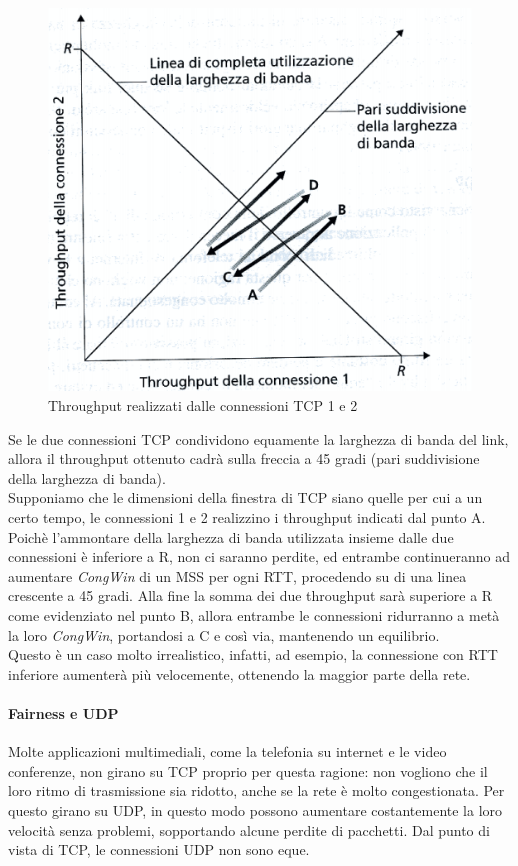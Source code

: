 \documentclass[11pt,a4paper]{book}
\begin{document}
\begin{figure}
	\includegraphics[scale=0.6]{img/048.png}
	\caption{Throughput realizzati dalle connessioni TCP 1 e 2}
\end{figure}
Se le due connessioni TCP condividono equamente la larghezza di banda del link, allora il throughput ottenuto cadrà sulla freccia a 45 gradi (pari suddivisione della larghezza di banda). \\
Supponiamo che le dimensioni della finestra di TCP siano quelle per cui a un certo tempo, le connessioni 1 e 2 realizzino i throughput indicati dal punto A. Poichè l'ammontare della larghezza di banda utilizzata insieme dalle due connessioni è inferiore a R, non ci saranno perdite, ed entrambe continueranno ad aumentare \emph{CongWin} di un MSS per ogni RTT, procedendo su di una linea crescente a 45 gradi. Alla fine la somma dei due throughput sarà superiore a R come evidenziato nel punto B, allora entrambe le connessioni ridurranno a metà la loro \emph{CongWin}, portandosi a C e così via, mantenendo un equilibrio. \\
Questo è un caso molto irrealistico, infatti, ad esempio, la connessione con RTT inferiore aumenterà più velocemente, ottenendo la maggior parte della rete.
\paragraph{Fairness e UDP}
Molte applicazioni multimediali, come la telefonia su internet e le video conferenze, non girano su TCP proprio per questa ragione: non vogliono che il loro ritmo di trasmissione sia ridotto, anche se la rete è molto congestionata. Per questo girano su UDP, in questo modo possono aumentare costantemente la loro velocità senza problemi, sopportando alcune perdite di pacchetti. Dal punto di vista di TCP, le connessioni UDP non sono eque.
\end{document}
